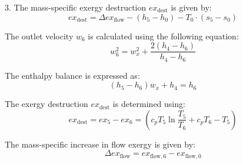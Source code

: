 3. The mass-specific exergy destruction \( ex_{\text{dest}} \) is given by:  
\[
ex_{\text{dest}} = \Delta ex_{\text{flow}} - \left( h_5 - h_0 \right) - T_0 \cdot \left( s_5 - s_0 \right)
\]

The outlet velocity \( w_6 \) is calculated using the following equation:  
\[
w_6^2 = w_x^2 + \frac{2(h_4 - h_6)}{h_4 - h_6}
\]

The enthalpy balance is expressed as:  
\[
(h_5 - h_6)w_x + h_4 = h_6
\]

The exergy destruction \( ex_{\text{dest}} \) is determined using:  
\[
ex_{\text{dest}} = ex_5 - ex_6 = (c_p T_5 \ln \frac{T_5}{T_6} + c_p T_6 - T_5)
\]

The mass-specific increase in flow exergy is given by:  
\[
\Delta ex_{\text{flow}} = ex_{\text{flow},6} - ex_{\text{flow},0}
\]